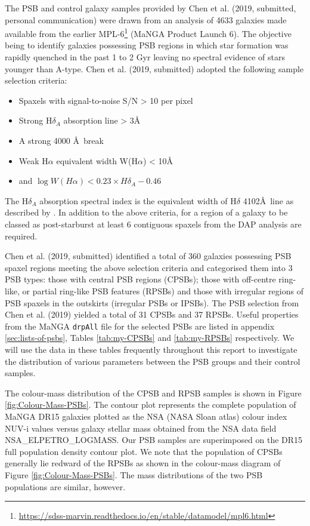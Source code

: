 The PSB and control galaxy samples provided by Chen et al. (2019, submitted, personal communication) were drawn from an analysis of 4633 galaxies made available from the earlier MPL-6\footnote{\href{}{https://sdss-marvin.readthedocs.io/en/stable/datamodel/mpl6.html}} (MaNGA Product Launch 6). The objective being to identify galaxies possessing PSB regions in which star formation was rapidly quenched in the past 1 to 2 Gyr leaving no spectral evidence of stars younger than A-type.  Chen et al. (2019, submitted) adopted the following sample selection criteria:
\begin{itemize}
    \item Spaxels with signal-to-noise S/N > 10 per pixel
    \item Strong H$\delta_A$ absorption line > 3\AA 
    \item A strong 4000 \AA\ break 
    \item Weak H$\alpha$ equivalent width W(H$\alpha$) < 10\AA
    \item and $\log{W(H\alpha)} < 0.23\times{H\delta_A}-0.46$
\end{itemize}
The H$\delta_A$ absorption spectral index is the equivalent width of H$\delta$ 4102\AA\ line as described by \citet{1994ApJS...94..687W}. In addition to the above criteria, for a region of a galaxy to be classed as post-starburst at least 6 contiguous spaxels from the DAP analysis are required. 

Chen et al. (2019, submitted) identified a total of 360 galaxies possessing PSB spaxel regions meeting the above selection criteria and categorised them into 3 PSB types: those with central PSB regions (CPSBs); those with off-centre ring-like, or partial ring-like PSB features (RPSBs) and those with irregular regions of PSB spaxels in the outskirts (irregular PSBs or IPSBs). The PSB selection from Chen et al. (2019) yielded a total of 31 CPSBs and 37 RPSBs. Useful properties from the MaNGA \texttt{drpAll} file for the selected PSBs are listed in appendix \ref{sec:lists-of-psbs}, Tables \ref{tab:my-CPSBs} and \ref{tab:my-RPSBs} respectively. We will use the data in these tables frequently throughout this report to investigate the distribution of various parameters between the PSB groups and their control samples.

The colour-mass distribution of the CPSB and RPSB samples is shown in Figure \ref{fig:Colour-Mass-PSBs}. The contour plot represents the complete population of MaNGA DR15 galaxies plotted as the NSA (NASA Sloan atlas) colour index NUV-i values versus galaxy stellar mass obtained from the NSA data field  NSA\_ELPETRO\_LOGMASS. Our PSB samples are superimposed on the DR15 full population density contour plot. We note that the population of CPSBs generally lie redward of the RPSBs as shown in the colour-mass diagram of Figure \ref{fig:Colour-Mass-PSBs}. The mass distributions of the two PSB populations are similar, however.

